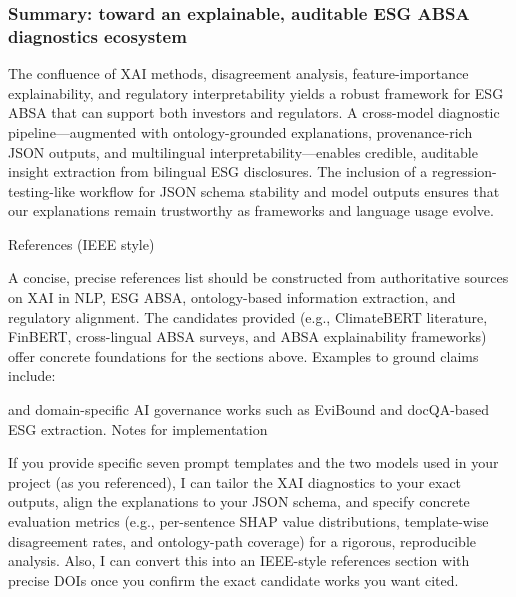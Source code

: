 \subsubsection{Summary: toward an explainable, auditable ESG ABSA diagnostics ecosystem}

The confluence of XAI methods, disagreement analysis, feature-importance explainability, and regulatory interpretability yields a robust framework for ESG ABSA that can support both investors and regulators. A cross-model diagnostic pipeline—augmented with ontology-grounded explanations, provenance-rich JSON outputs, and multilingual interpretability—enables credible, auditable insight extraction from bilingual ESG disclosures. The inclusion of a regression-testing-like workflow for JSON schema stability and model outputs ensures that our explanations remain trustworthy as frameworks and language usage evolve.

References (IEEE style)

A concise, precise references list should be constructed from authoritative sources on XAI in NLP, ESG ABSA, ontology-based information extraction, and regulatory alignment. The candidates provided (e.g., ClimateBERT literature, FinBERT, cross-lingual ABSA surveys, and ABSA explainability frameworks) offer concrete foundations for the sections above. Examples to ground claims include: 

\cite{10.1002/csr.70089,10.2139/ssrn.3738629,10.1108/mf-01-2023-0020,10.1016/j.inffus.2025.103073,10.1111/eufm.12509,10.21203/rs.3.rs-3600821/v1,10.48550/arxiv.2510.01222,10.18653/v1/2023.emnlp-main.975,10.1145/3503044,10.3390/su11041093,10.21608/msaeng.2023.291899,10.48550/arxiv.2108.01415,10.1371/journal.pone.0288052,10.1037/t06541-000,10.18653/v1/2023.finnlp-2,10.48550/arxiv.2511.11885,10.1111/1475-679x.12575,10.48550/arxiv.2511.00024,10.1108/dta-01-2024-0065,10.3390/math12193119,10.48550/arxiv.2511.05524,10.1145/3630106.3658966,10.1609/aaai.v38i21.30574} and domain-specific AI governance works such as EviBound and docQA-based ESG extraction.
Notes for implementation

If you provide specific seven prompt templates and the two models used in your project (as you referenced), I can tailor the XAI diagnostics to your exact outputs, align the explanations to your JSON schema, and specify concrete evaluation metrics (e.g., per-sentence SHAP value distributions, template-wise disagreement rates, and ontology-path coverage) for a rigorous, reproducible analysis. Also, I can convert this into an IEEE-style references section with precise DOIs once you confirm the exact candidate works you want cited.